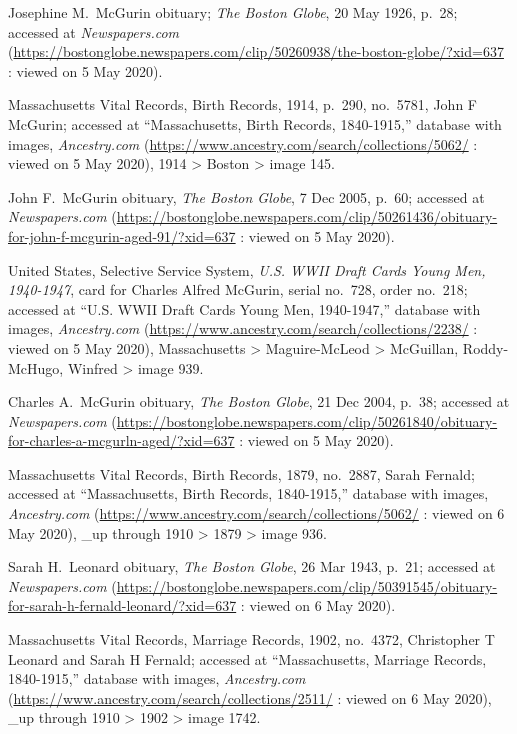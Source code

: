 \begin{thebibliography}{999}
	Josephine M.\ McGurin obituary; \textit{The Boston Globe}, 20 May 1926, p.\ 28; accessed at \textit{Newspapers.com} (\url{https://bostonglobe.newspapers.com/clip/50260938/the-boston-globe/?xid=637} : viewed on 5 May 2020).
	
	Massachusetts Vital Records, Birth Records, 1914, p.\ 290, no.\ 5781, John F McGurin; accessed at ``Massachusetts, Birth Records, 1840-1915,'' database with images, \textit{Ancestry.com} (\url{https://www.ancestry.com/search/collections/5062/} : viewed on 5 May 2020), 1914 > Boston > image 145.	
	
	John F.\ McGurin obituary, \textit{The Boston Globe}, 7 Dec 2005, p.\ 60; accessed at \textit{Newspapers.com} (\url{https://bostonglobe.newspapers.com/clip/50261436/obituary-for-john-f-mcgurin-aged-91/?xid=637} : viewed on 5 May 2020).
	
	United States, Selective Service System, \textit{U.S. WWII Draft Cards Young Men, 1940-1947}, card for Charles Alfred McGurin, serial no.\ 728, order no.\ 218; accessed at ``U.S. WWII Draft Cards Young Men, 1940-1947,'' database with images, \textit{Ancestry.com} (\url{https://www.ancestry.com/search/collections/2238/} : viewed on 5 May 2020), Massachusetts > Maguire-McLeod > McGuillan, Roddy-McHugo, Winfred > image 939.
	
	Charles A.\ McGurin obituary, \textit{The Boston Globe}, 21 Dec 2004, p.\ 38; accessed at \textit{Newspapers.com} (\url{https://bostonglobe.newspapers.com/clip/50261840/obituary-for-charles-a-mcgurln-aged/?xid=637} : viewed on 5 May 2020).
	
	Massachusetts Vital Records, Birth Records, 1879, no.\ 2887, Sarah Fernald; accessed at ``Massachusetts, Birth Records, 1840-1915,'' database with images, \textit{Ancestry.com} (\url{https://www.ancestry.com/search/collections/5062/} : viewed on 6 May 2020), \_up through 1910 > 1879 > image 936.
	
	Sarah H.\ Leonard obituary, \textit{The Boston Globe}, 26 Mar 1943, p.\ 21; accessed at \textit{Newspapers.com} (\url{https://bostonglobe.newspapers.com/clip/50391545/obituary-for-sarah-h-fernald-leonard/?xid=637} : viewed on 6 May 2020).
	
	Massachusetts Vital Records, Marriage Records, 1902, no.\ 4372, Christopher T Leonard and Sarah H Fernald; accessed at ``Massachusetts, Marriage Records, 1840-1915,'' database with images, \textit{Ancestry.com} (\url{https://www.ancestry.com/search/collections/2511/} : viewed on 6 May 2020), \_up through 1910 > 1902 > image 1742.
	

\end{thebibliography}
